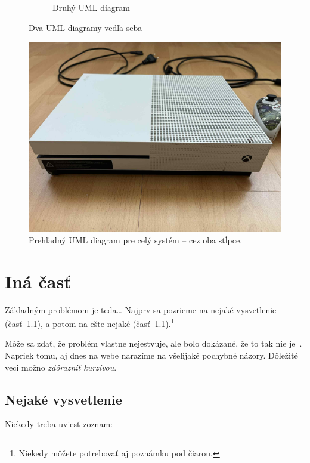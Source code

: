 \documentclass[10pt,twocolumn,twoside,slovak,a4paper]{article}
\begin{document}
\begin{figure}[h!]
\begin{subfigure}[t]{0.48\columnwidth}
        \caption{Druhý UML diagram}
        \label{fig:diagram2}
    \end{subfigure}
    \caption{Dva UML diagramy vedľa seba}
    \label{fig:uml-diagrams}
\end{figure}
\begin{figure}[t!]
    \centering
    \includegraphics[width=\textwidth]{obrazokcez2.jpg}
    \caption{Prehľadný UML diagram pre celý systém – cez oba stĺpce.}
    \label{fig:uml-wide}
\end{figure}

\section{Iná časť} \label{ina}

Základným problémom je teda\ldots{} Najprv sa pozrieme na nejaké vysvetlenie (časť~\ref{ina:nejake}), a potom na ešte nejaké (časť~\ref{ina:nejake}).\footnote{Niekedy môžete potrebovať aj poznámku pod čiarou.}

Môže sa zdať, že problém vlastne nejestvuje\cite{Coplien:MPD}, ale bolo dokázané, že to tak nie je~\cite{Czarnecki:Staged, Czarnecki:Progress}. Napriek tomu, aj dnes na webe narazíme na všelijaké pochybné názory\cite{PLP-Framework}. Dôležité veci možno \emph{zdôrazniť kurzívou}.


\subsection{Nejaké vysvetlenie} \label{ina:nejake}

Niekedy treba uviesť zoznam:
\end{document}
